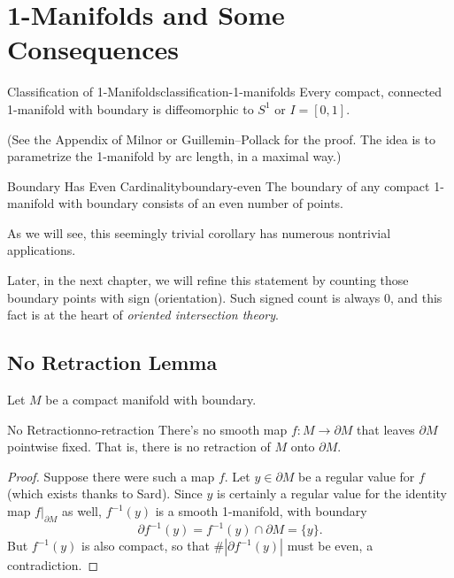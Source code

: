 
\section{1-Manifolds and Some Consequences}

\begin{theorem}{Classification of 1-Manifolds}{classification-1-manifolds}
    Every compact, connected 1-manifold with boundary is diffeomorphic to $S^1$ or $I = [0,1]$.
\end{theorem}

(See the Appendix of Milnor or Guillemin--Pollack for the proof. The idea is to parametrize the 1-manifold by arc length, in a maximal way.)

\begin{corollary}{Boundary Has Even Cardinality}{boundary-even}
    The boundary of any compact 1-manifold with boundary consists of an even number of points.
\end{corollary}

As we will see, this seemingly trivial corollary has numerous nontrivial applications.

Later, in the next chapter, we will refine this statement by counting those boundary points with sign (orientation). Such signed count is always $0$, and this fact is at the heart of \emph{oriented intersection theory}.

\subsection{No Retraction Lemma}

Let $M$ be a compact manifold with boundary.

\begin{lemma}{No Retraction}{no-retraction}
    There's no smooth map $f \colon M \to \partial M$ that leaves $\partial M$ pointwise fixed. That is, there is no retraction of $M$ onto $\partial M$.
\end{lemma}

\begin{proof}
    Suppose there were such a map $f$. Let $y \in \partial M$ be a regular value for $f$ (which exists thanks to Sard). Since $y$ is certainly a regular value for the identity map $f|_{\partial M}$ as well, $f^{-1}(y)$ is a smooth 1-manifold, with boundary
    \[
        \partial f^{-1}(y) = f^{-1}(y) \cap \partial M = \{y\}.
    \]
    But $f^{-1}(y)$ is also compact, so that $\#|\partial f^{-1}(y)|$ must be even, a contradiction.
\end{proof}

